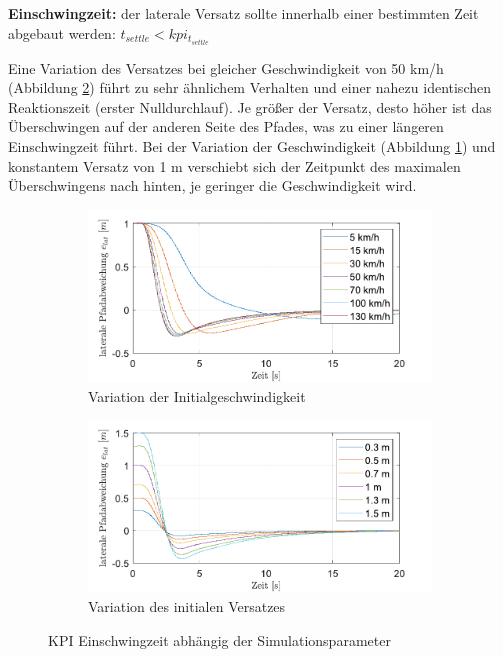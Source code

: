 \medskip\noindent\textbf{Einschwingzeit:} der laterale Versatz sollte innerhalb einer bestimmten Zeit abgebaut werden: $t_{settle} < kpi_{t_{settle}}$

\noindent Eine Variation des Versatzes bei gleicher Geschwindigkeit von 50 km/h (Abbildung \ref{fig:varOffset_50kmh_s-Error}) führt zu sehr ähnlichem Verhalten und einer nahezu identischen Reaktionszeit (erster Nulldurchlauf). Je größer der Versatz, desto höher ist das Überschwingen auf der anderen Seite des Pfades, was zu einer längeren Einschwingzeit führt. Bei der Variation der Geschwindigkeit (Abbildung \ref{fig:varVelo_1mOffset_s-Error}) und konstantem Versatz von 1 m verschiebt sich der Zeitpunkt des maximalen Überschwingens nach hinten, je geringer die Geschwindigkeit wird.
\begin{figure}[ht]
    \centering
    \begin{subfigure}[b]{.49\textwidth}
        \centering
        \includegraphics[width=\textwidth]{figures/3_Implementierung/Straight_Offset/varVelo_1mOffset_s-Error.pdf}
        \caption{Variation der Initialgeschwindigkeit}
        \label{fig:varVelo_1mOffset_s-Error}
    \end{subfigure}
    \hfill
    \begin{subfigure}[b]{.49\textwidth}
        \centering
        \includegraphics[width=\textwidth]{figures/3_Implementierung/Straight_Offset/varOffset_50kmh_s-Error.pdf}
        \caption{Variation des initialen Versatzes}
        \label{fig:varOffset_50kmh_s-Error}
    \end{subfigure}
    \caption{KPI Einschwingzeit abhängig der Simulationsparameter}
    \label{fig:Straight_Offset_s-Error}
\end{figure}

